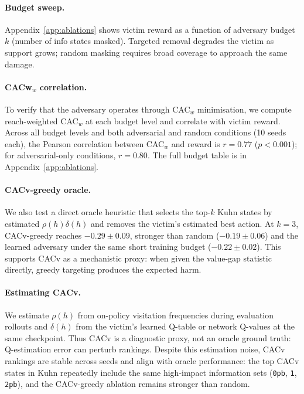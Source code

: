 \documentclass{article}
\begin{document}
\paragraph{Budget sweep.}
Appendix~\ref{app:ablations} shows victim reward as a function of adversary budget $k$ (number of info states masked). Targeted removal degrades the victim as support grows; random masking requires broad coverage to approach the same damage.

\paragraph{CACw$_w$ correlation.}
To verify that the adversary operates through CAC$_w$ minimisation, we compute reach-weighted CAC$_w$ at each budget level and correlate with victim reward. Across all budget levels and both adversarial and random conditions (10 seeds each), the Pearson correlation between CAC$_w$ and reward is $r = 0.77$ ($p < 0.001$); for adversarial-only conditions, $r = 0.80$. The full budget table is in Appendix~\ref{app:ablations}.

\paragraph{CACv-greedy oracle.}
We also test a direct oracle heuristic that selects the top-$k$ Kuhn states by estimated $\rho(h)\delta(h)$ and removes the victim's estimated best action. At $k=3$, CACv-greedy reaches $-0.29 \pm 0.09$, stronger than random ($-0.19 \pm 0.06$) and the learned adversary under the same short training budget ($-0.22 \pm 0.02$). This supports CACv as a mechanistic proxy: when given the value-gap statistic directly, greedy targeting produces the expected harm.

\paragraph{Estimating CACv.}
We estimate $\rho(h)$ from on-policy visitation frequencies during evaluation rollouts and $\delta(h)$ from the victim's learned Q-table or network Q-values at the same checkpoint. Thus CACv is a diagnostic proxy, not an oracle ground truth: Q-estimation error can perturb rankings. Despite this estimation noise, CACv rankings are stable across seeds and align with oracle performance: the top CACv states in Kuhn repeatedly include the same high-impact information sets (\texttt{0pb}, \texttt{1}, \texttt{2pb}), and the CACv-greedy ablation remains stronger than random.
\end{document}
